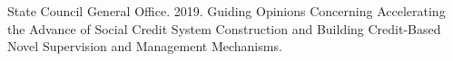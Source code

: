 \begin{thebibliography}{00}
 State Council General Office. 2019. Guiding Opinions Concerning Accelerating the Advance of Social Credit System Construction and Building Credit-Based Novel Supervision and Management Mechanisms.
\end{thebibliography}

%

